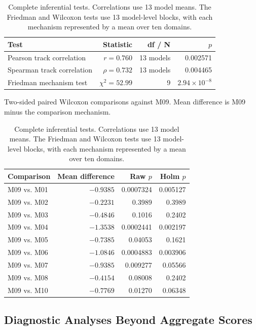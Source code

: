 \begin{table}[htbp]
\caption{Complete inferential tests. Correlations use 13 model means. The
Friedman and Wilcoxon tests use 13 model-level blocks, with each mechanism
represented by a mean over ten domains.}
\label{tab:supp-tests}
\centering
\small
{}
\begin{tabularx}{0.82\textwidth}{Xrrr}
\toprule
\rowcolor{supphead}
Test & Statistic & df / N & $p$\\
\midrule
Pearson track correlation & $r=0.760$ & 13 models & 0.002571\\
Spearman track correlation & $\rho=0.732$ & 13 models & 0.004465\\
Friedman mechanism test & $\chi^2=52.99$ & 9 & $2.94\times10^{-8}$\\
\bottomrule
\end{tabularx}
\vspace{6pt}
\parbox{0.78\textwidth}{\centering\small Two-sided paired Wilcoxon comparisons
against M09. Mean difference is M09 minus the comparison mechanism.}\par\smallskip
{}
\begin{tabularx}{0.78\textwidth}{Xrrr}
\toprule
\rowcolor{supppurple!15}
Comparison & Mean difference & Raw $p$ & Holm $p$\\
\midrule
M09 vs. M01 & $-0.9385$ & 0.0007324 & 0.005127\\
M09 vs. M02 & $-0.2231$ & 0.3989 & 0.3989\\
M09 vs. M03 & $-0.4846$ & 0.1016 & 0.2402\\
M09 vs. M04 & $-1.3538$ & 0.0002441 & 0.002197\\
M09 vs. M05 & $-0.7385$ & 0.04053 & 0.1621\\
M09 vs. M06 & $-1.0846$ & 0.0004883 & 0.003906\\
M09 vs. M07 & $-0.9385$ & 0.009277 & 0.05566\\
M09 vs. M08 & $-0.4154$ & 0.08008 & 0.2402\\
M09 vs. M10 & $-0.7769$ & 0.01270 & 0.06348\\
\bottomrule
\end{tabularx}
\end{table}

\subsection{Diagnostic Analyses Beyond Aggregate Scores}

